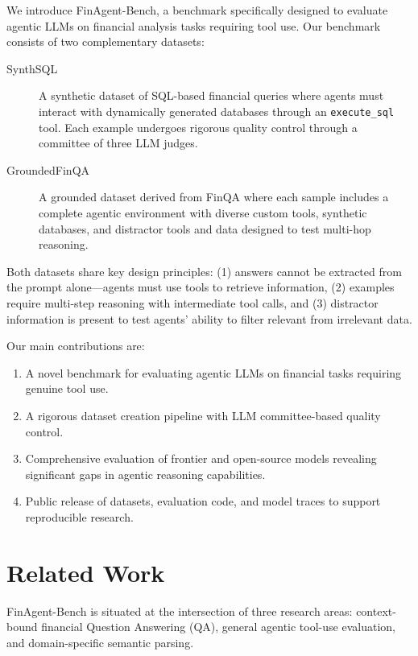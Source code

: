 \documentclass[11pt]{article}
\newcommand{\datasetname}{FinAgent-Bench\xspace}
\newcommand{\synthsubset}{SynthSQL\xspace}
\newcommand{\groundedfinqa}{GroundedFinQA\xspace}
\begin{document}
We introduce \datasetname, a benchmark specifically designed to evaluate agentic LLMs on financial analysis tasks requiring tool use.
Our benchmark consists of two complementary datasets:

\begin{description}
    \item[\synthsubset] A synthetic dataset of SQL-based financial queries where agents must interact with dynamically generated
    databases through an \texttt{execute\_sql} tool. Each example undergoes rigorous quality control through a committee of three LLM judges.

    \item[\groundedfinqa] A grounded dataset derived from FinQA where each sample includes a complete agentic environment with
    diverse custom tools, synthetic databases, and distractor tools and data designed to test multi-hop reasoning.
\end{description}

Both datasets share key design principles: (1) answers cannot be extracted from the prompt alone---agents must use tools to retrieve
information, (2) examples require multi-step reasoning with intermediate tool calls, and (3) distractor information is present to test
agents' ability to filter relevant from irrelevant data.

Our main contributions are:
\begin{enumerate}
    \item A novel benchmark for evaluating agentic LLMs on financial tasks requiring genuine tool use.
    \item A rigorous dataset creation pipeline with LLM committee-based quality control.
    \item Comprehensive evaluation of frontier and open-source models revealing significant gaps in agentic reasoning capabilities.
    \item Public release of datasets, evaluation code, and model traces to support reproducible research.
\end{enumerate}

\section{Related Work}

\datasetname is situated at the intersection of three research areas: context-bound financial Question Answering (QA), general
agentic tool-use evaluation, and domain-specific semantic parsing.
\end{document}
